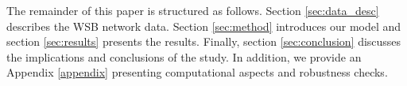 The remainder of this paper is structured as follows. %
Section \ref{sec:data_desc} describes the WSB network data. Section \ref{sec:method} introduces our model and section \ref{sec:results} presents the results. Finally, section \ref{sec:conclusion} discusses the implications and conclusions of the study. In addition, we provide an Appendix \ref{appendix} presenting computational aspects and robustness checks.








